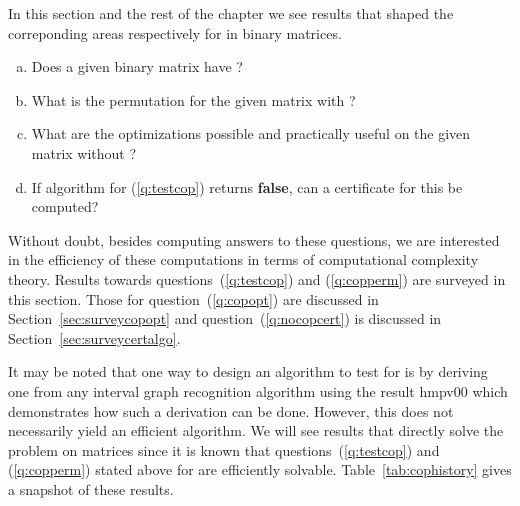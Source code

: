 In this section and the rest of the chapter we see results that shaped the
correponding areas respectively for \cop in binary matrices.

\begin{enumerate}[a.]
\singlespacing
\item \label{q:testcop} Does a given binary matrix have \COP?
\item \label{q:copperm} What is the \COP permutation for the given matrix with \COP?
\item \label{q:copopt} What are the optimizations possible and practically useful on
  the given matrix without \COP?
\item \label{q:nocopcert} If algorithm for (\ref{q:testcop}) returns
  \textbf{false}, can a certificate for this be computed?
\end{enumerate}

Without doubt, besides computing answers to these questions, we are
interested in the efficiency of these computations in terms of
computational complexity theory. Results towards
questions~(\ref{q:testcop}) and (\ref{q:copperm}) are surveyed in this
section. Those for question~(\ref{q:copopt}) are discussed in
Section~\ref{sec:surveycopopt} and question~(\ref{q:nocopcert}) is discussed
in Section~\ref{sec:surveycertalgo}.

It may be noted that one way to design an algorithm to test for \COP
is by deriving one from any interval graph recognition algorithm using the
result {\sc hmpv00}  \cite{d08phd} which demonstrates how such a derivation can be
done. However, this does not necessarily yield an efficient
algorithm. We will see results that directly solve the problem on
matrices since it is known that questions~(\ref{q:testcop}) and
(\ref{q:copperm}) stated above for \COP are efficiently solvable.
Table~\ref{tab:cophistory} gives a snapshot of these results.



